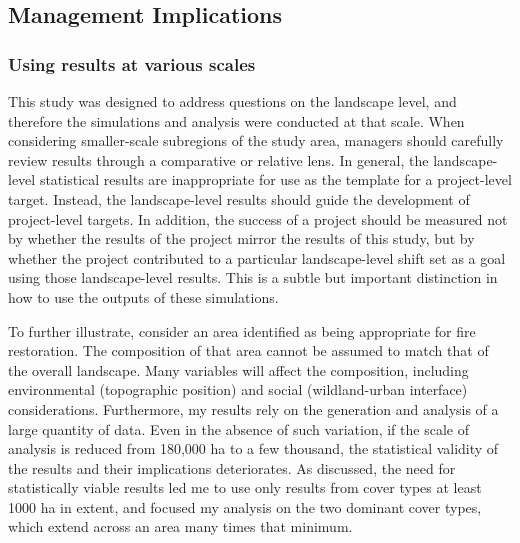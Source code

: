 





\subsection{Management Implications}

\subsubsection{Using results at various scales}
This study was designed to address questions on the landscape level, and therefore the simulations and analysis were conducted at that scale. When considering smaller-scale subregions of the study area, managers should carefully review results through a comparative or relative lens. In general, the landscape-level statistical results are inappropriate for use as the template for a project-level target. Instead, the landscape-level results should guide the development of project-level targets. In addition, the success of a project should be measured not by whether the results of the project mirror the results of this study, but by whether the project contributed to a particular landscape-level shift set as a goal using those landscape-level results. This is a subtle but important distinction in how to use the outputs of these simulations. 

To further illustrate, consider an area identified as being appropriate for fire restoration. The composition of that area cannot be assumed to match that of the overall landscape. Many variables will affect the composition, including environmental (topographic position) and social (wildland-urban interface) considerations. Furthermore, my results rely on the generation and analysis of a large quantity of data. Even in the absence of such variation, if the scale of analysis is reduced from 180,000 ha to a few thousand, the statistical validity of the results and their implications deteriorates. As discussed, the need for statistically viable results led me to use only results from cover types at least 1000 ha in extent, and focused my analysis on the two dominant cover types, which extend across an area many times that minimum.

